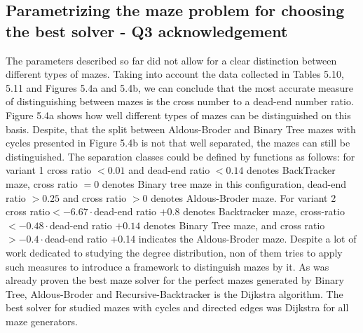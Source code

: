 \subsection{Parametrizing the maze problem for choosing the best solver - Q3 acknowledgement}
The parameters described so far did not allow for a clear distinction between different types of mazes. Taking into account the data collected in Tables 5.10, 5.11 and Figures 5.4a and 5.4b,
we can conclude that the most accurate measure of distinguishing between mazes is the cross number to a dead-end number ratio.
Figure 5.4a shows how well different types of mazes can be distinguished on this basis. Despite, that the split between Aldous-Broder and Binary Tree
mazes with cycles presented in Figure 5.4b is not that well separated, the mazes can still be distinguished. 
The separation classes could be defined by functions as follows: for variant 1 cross ratio $< 0.01$ and dead-end ratio $< 0.14$ denotes BackTracker maze,
cross ratio $= 0$ denotes Binary tree maze in this configuration, dead-end ratio $> 0.25$ and cross ratio $> 0$ denotes Aldous-Broder maze.
For variant 2 cross ratio$ < -6.67\cdot$dead-end ratio $+ 0.8$ denotes Backtracker maze, cross-ratio $< -0.48\cdot$dead-end ratio $+0.14$ denotes Binary Tree maze, 
and cross ratio$ > -0.4\cdot$dead-end ratio +0.14 indicates the Aldous-Broder maze.
Despite a lot of work dedicated to studying the degree distribution, non of them tries to apply such measures to introduce a framework to distinguish mazes by it.
As was already proven the best maze solver for the perfect mazes generated by Binary Tree, Aldous-Broder and Recursive-Backtracker is the Dijkstra algorithm.
The best solver for studied mazes with cycles and directed edges was Dijkstra for all maze generators.

